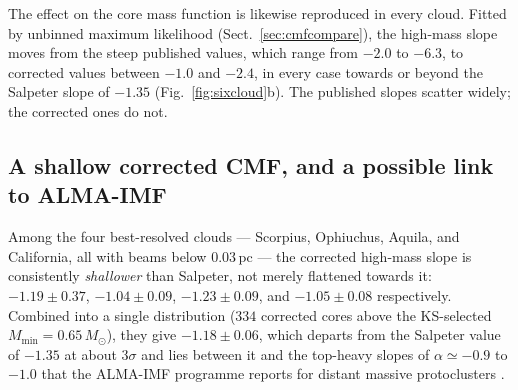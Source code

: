 \documentclass[11pt,a4paper]{article}
\newcommand{\msun}{M_{\odot}}
\begin{document}
The effect on the core mass function is likewise reproduced in every cloud.
Fitted by unbinned maximum likelihood (Sect.~\ref{sec:cmfcompare}), the
high-mass slope moves from the steep published values, which range from
$-2.0$ to $-6.3$, to corrected values between $-1.0$ and $-2.4$, in every case
towards or beyond the Salpeter slope of $-1.35$ (Fig.~\ref{fig:sixcloud}b).
The published slopes scatter widely; the corrected ones do not.

\subsection{A shallow corrected CMF, and a possible link to ALMA-IMF}
\label{sec:shallowcmf}

Among the four best-resolved clouds --- Scorpius, Ophiuchus, Aquila, and
California, all with beams below $0.03$\,pc --- the corrected high-mass slope
is consistently \emph{shallower} than Salpeter, not merely flattened towards
it: $-1.19\pm0.37$, $-1.04\pm0.09$, $-1.23\pm0.09$, and $-1.05\pm0.08$
respectively. Combined into a single distribution ($334$ corrected cores above
the KS-selected $M_{\mathrm{min}}=0.65\,\msun$), they give $-1.18\pm0.06$,
which departs from the Salpeter value of $-1.35$ at about $3\sigma$ and lies
between it and the top-heavy slopes of $\alpha\simeq-0.9$ to $-1.0$ that the
ALMA-IMF programme reports for distant massive protoclusters
\citep[e.g.][]{Motte+2018}.
\end{document}
